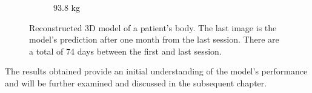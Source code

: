 \begin{figure}[h]
\begin{subfigure}{0.3\textwidth}
		\caption{93.8 kg}
	\end{subfigure}
	\caption[Reconstructed 3D model of the patient's body.]{Reconstructed 3D model of a patient's body. The last image is the model's prediction after one month from the last session. There are a total of 74 days between the first and last session.}
	\label{fig:patient-body-model}
\end{figure}

The results obtained provide an initial understanding of the model's
performance and will be further examined and discussed in the subsequent
chapter.